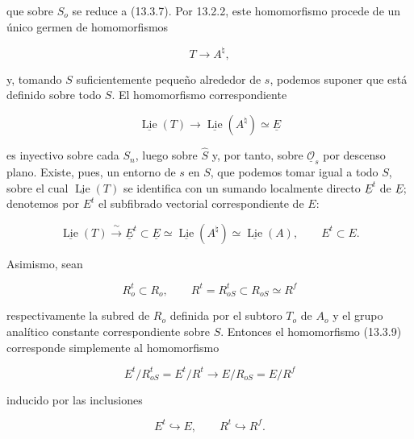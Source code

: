\noindent
que sobre $S_o$ se reduce a (13.3.7). Por 13.2.2, este homomorfismo
procede de un único germen de homomorfismos

\begin{equation}\tag{13.3.9}
 T\longrightarrow A^\natural,
\end{equation}

\noindent
y, tomando $S$ suficientemente pequeño alrededor de $s$, podemos
suponer que está definido sobre todo $S$. El homomorfismo correspondiente

\begin{equation*}
 \underline{\operatorname{Lie}}(T)\longrightarrow
 \underline{\operatorname{Lie}}(A^\natural)\simeq\underline E
\end{equation*}

\noindent
es inyectivo sobre cada $S_n$, luego sobre $\widehat S$ y, por tanto,
sobre $\underline{\mathcal O}_s$ por descenso plano. Existe, pues, un
entorno de $s$ en $S$, que podemos tomar igual a todo $S$, sobre el cual
$\underline{\operatorname{Lie}}(T)$ se identifica con un sumando
localmente directo $\underline E^t$ de $\underline E$; denotemos por
$E^t$ el subfibrado vectorial correspondiente de $E$:


\begin{equation}\tag{13.3.10}
 \underline{\operatorname{Lie}}(T)\xrightarrow{\ \sim\ }
 \underline E^t\subset\underline E\simeq
 \underline{\operatorname{Lie}}(A^\natural)\simeq
 \underline{\operatorname{Lie}}(A),
 \qquad E^t\subset E.
\end{equation}

\noindent
Asimismo, sean

\begin{equation}\tag{13.3.11}
 R_o^t\subset R_o,
 \qquad R^t=R_{oS}^t\subset R_{oS}\simeq R^f
\end{equation}

\noindent
respectivamente la subred de $R_o$ definida por el subtoro $T_o$ de
$A_o$ y el grupo analítico constante correspondiente sobre $S$. Entonces
el homomorfismo (13.3.9) corresponde simplemente al homomorfismo

\begin{equation*}
 E^t/R_{oS}^t=E^t/R^t\longrightarrow E/R_{oS}=E/R^f
\end{equation*}

\noindent
inducido por las inclusiones

\begin{equation*}
 E^t\hookrightarrow E,
 \qquad R^t\hookrightarrow R^f.
\end{equation*}

